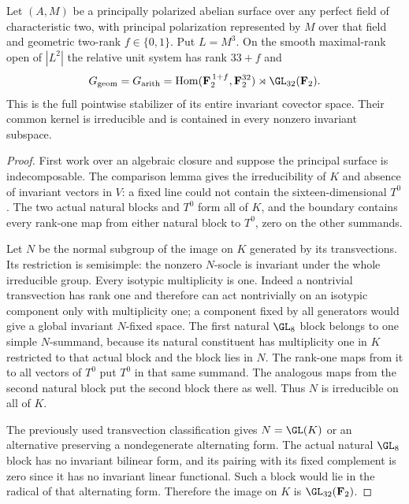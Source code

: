 \begin{theorem}
\label{thm:every-nonordinary-ppav-degree-two-full-candidate}
Let $(A,M)$ be a principally polarized abelian surface over any
perfect field of characteristic two, with principal polarization
represented by $M$ over that field and geometric two-rank
$f\in\{0,1\}$. Put $L=M^3$. On the smooth maximal-rank open of
$|L^2|$ the relative unit system has rank $33+f$ and
\[
 G_{\mathrm{geom}}=G_{\mathrm{arith}}
   =\operatorname{Hom}(\mathbf F_2^{\,1+f},\mathbf F_2^{32})
                      \rtimes\GL_{32}(\mathbf F_2).
\]
This is the full pointwise stabilizer of its entire invariant
covector space. Their common kernel is irreducible and is
contained in every nonzero invariant subspace.
\end{theorem}
\begin{proof}
First work over an algebraic closure and suppose the principal
surface is indecomposable. The comparison lemma gives the
irreducibility of $K$ and absence of invariant vectors in $V$:
a fixed line could not contain the sixteen-dimensional $T^0$.
The two actual natural blocks and $T^0$ form all of $K$, and
the boundary contains every rank-one map from either natural
block to $T^0$, zero on the other summands.

Let $N$ be the normal subgroup of the image on $K$ generated
by its transvections. Its restriction is semisimple: the
nonzero $N$-socle is invariant under the whole irreducible
group. Every isotypic multiplicity is one. Indeed a nontrivial
transvection has rank one and therefore can act nontrivially
on an isotypic component only with multiplicity one; a component
fixed by all generators would give a global invariant
$N$-fixed space. The first natural $\GL_8$ block belongs to
one simple $N$-summand, because its natural constituent has
multiplicity one in $K$ restricted to that actual block and
the block lies in $N$. The rank-one maps from it to all vectors
of $T^0$ put $T^0$ in that same summand. The analogous maps
from the second natural block put the second block there as
well. Thus $N$ is irreducible on all of $K$.

The previously used transvection classification
\cite[Theorem~3.6, printed p.~22]{KantorSeress2001} gives
$N=\GL(K)$ or an alternative preserving a nondegenerate
alternating form. The actual natural $\GL_8$ block has no
invariant bilinear form, and its pairing with its fixed
complement is zero since it has no invariant linear functional.
Such a block would lie in the radical of that alternating
form. Therefore the image on $K$ is $\GL_{32}(\mathbf F_2)$.


\end{proof}
